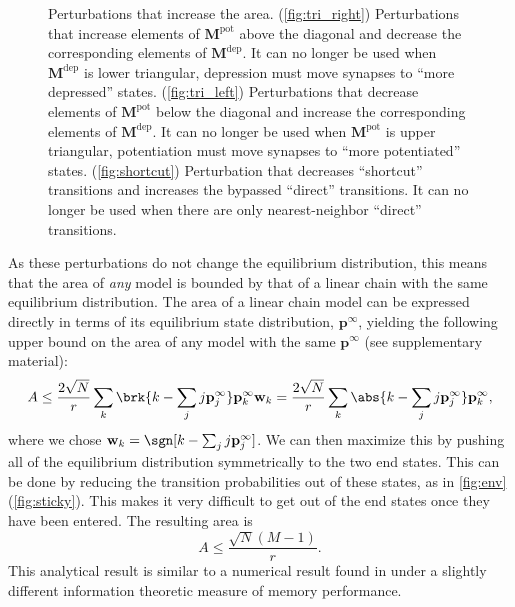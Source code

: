 \documentclass{article} %
\newcommand{\pr}{\mathbf{p}}
\newcommand{\eq}{\pr^\infty}
\newcommand{\w}{\mathbf{w}}
\newcommand{\M}{\mathbf{M}}
\newcommand{\pot}{^{\text{pot}}}
\newcommand{\dep}{^{\text{dep}}}
\begin{document}
\begin{figure}[tbp]
 \begin{center}
 \begin{myenuma}
  \item{}\label{fig:tri_right}\hp
  \item{}\label{fig:tri_left}\hp
  \item{}\label{fig:shortcut}
 \end{myenuma}
 \end{center}
  \caption{Perturbations that increase the area.
  (\ref{fig:tri_right}) Perturbations that increase elements of $\M\pot$ above the diagonal and decrease the corresponding elements of $\M\dep$. It can no longer be used when $\M\dep$ is lower triangular, \ie depression must move synapses to ``more depressed'' states.
  (\ref{fig:tri_left}) Perturbations that decrease elements of $\M\pot$ below the diagonal and increase the corresponding elements of $\M\dep$. It can no longer be used when $\M\pot$ is upper triangular, \ie potentiation must move synapses to ``more potentiated'' states.
  (\ref{fig:shortcut}) Perturbation that decreases ``shortcut'' transitions and increases the bypassed ``direct'' transitions. It can no longer be used when there are only nearest-neighbor ``direct'' transitions.
  }\label{fig:perts}
\end{figure}

As these perturbations do not change the equilibrium distribution, this means that the area of \emph{any} model is bounded by that of a linear chain with the same equilibrium distribution.
The area of a linear chain model can be expressed directly in terms of its equilibrium state distribution, $\eq$, yielding the following upper bound on the area of any model with the same $\eq$ (see supplementary material):
%
\begin{equation}\label{eq:multistatearea}
  A \leq \frac{2\sqrt{N}}{r} \sum_k \brk{k - \sum_j j\eq_j} \eq_k \w_k
    = \frac{2\sqrt{N}}{r} \sum_k \abs{k - \sum_j j\eq_j} \eq_k ,
\end{equation}
%
where we chose $\w_k=\sgn[{k - \sum_j j\eq_j}]$.
We can then maximize this by pushing all of the equilibrium distribution symmetrically to the two end states.
This can be done by reducing the transition probabilities out of these states, as in \autoref{fig:env}(\ref{fig:sticky}).%
This makes it very difficult to get out of the end states once they have been entered.
The resulting area is
%
\begin{equation}\label{eq:max_area}
  A \leq \frac{\sqrt{N}(M-1)}{r}.
\end{equation}
%
This analytical result is similar to a numerical result found in \cite{Barrett2008discrete} under a slightly different information theoretic measure of memory performance.
\end{document}
